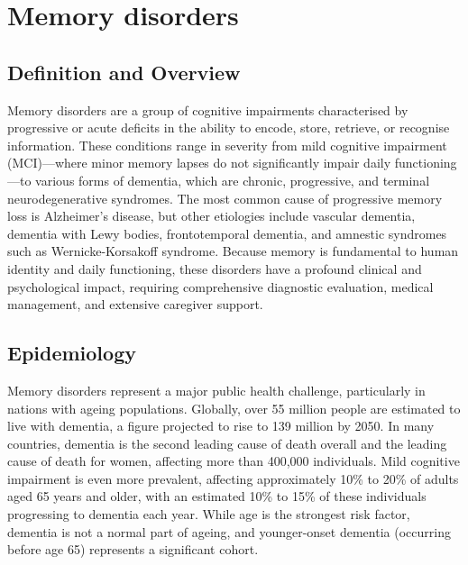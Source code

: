 \chapter{Memory disorders}

\section*{Definition and Overview}
Memory disorders are a group of cognitive impairments characterised by progressive or acute deficits in the ability to encode, store, retrieve, or recognise information. These conditions range in severity from mild cognitive impairment (MCI)—where minor memory lapses do not significantly impair daily functioning—to various forms of dementia, which are chronic, progressive, and terminal neurodegenerative syndromes. The most common cause of progressive memory loss is Alzheimer's disease, but other etiologies include vascular dementia, dementia with Lewy bodies, frontotemporal dementia, and amnestic syndromes such as Wernicke-Korsakoff syndrome. Because memory is fundamental to human identity and daily functioning, these disorders have a profound clinical and psychological impact, requiring comprehensive diagnostic evaluation, medical management, and extensive caregiver support.

\section*{Epidemiology}
Memory disorders represent a major public health challenge, particularly in nations with ageing populations. Globally, over 55 million people are estimated to live with dementia, a figure projected to rise to 139 million by 2050. In many countries, dementia is the second leading cause of death overall and the leading cause of death for women, affecting more than 400,000 individuals. Mild cognitive impairment is even more prevalent, affecting approximately 10\% to 20\% of adults aged 65 years and older, with an estimated 10\% to 15\% of these individuals progressing to dementia each year. While age is the strongest risk factor, dementia is not a normal part of ageing, and younger-onset dementia (occurring before age 65) represents a significant cohort.

